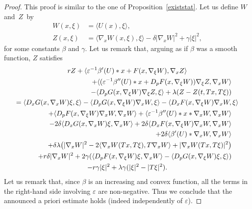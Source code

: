 \documentclass[JEP,XML,SOM,Unicode,NoEqCountersInSection,published]{cedram}
\let\epsilon\varepsilon
\theoremstyle{definition}
\begin{document}
\begin{proof}
This proof is similar to the one of Proposition~\ref{existstat}. Let us define $W$ and~$Z$~by
\begin{align*}
W(x,\xi) &= \langle U(x),\xi\rangle,\\
Z(x,\xi) &= \langle \nabla_x W (x, \xi), \xi\rangle-\delta |\nabla_x W|^2+\gamma |\xi|^2,
\end{align*}
for some constants $\beta$ and $\gamma$. Let us remark that, arguing as if $\beta$ was a smooth function, $Z$ satisfies\vspace*{-5pt}
\begin{multline}\label{Zedppenal}
 r Z+\langle \epsilon^{-1}\beta'(U)*x+F(x,\nabla_{\xi} W), \nabla_x Z\rangle\\
\shoveright{ +\langle (\epsilon^{-1}\beta''(U)*x+D_p F (x,\nabla_{\xi} W)) \nabla_{\xi}Z , \nabla_{x} W\rangle}\\
\shoveright{- \langle D_p G(x, \nabla_{\xi}W)\nabla_{\xi}Z, \xi\rangle+\lambda(Z- Z(t,Tx, T\xi))}\\
 = \langle D_xG(x, \nabla_x W) \xi, \xi\rangle-\langle D_pG(x, \nabla_{\xi}W) \nabla_x W, \xi\rangle-\langle D_x F(x, \nabla_{\xi} W) \nabla_x W, \xi\rangle \\
\shoveright{+ \langle D_p F(x, \nabla_{\xi}W) \nabla_x W, \nabla_x W\rangle+\langle \epsilon^{-1} \beta''(U)*x*\nabla_x W, \nabla_x W\rangle}\\
\shoveright{- 2 \delta \langle D_x G(x, \nabla_x W)\xi, \nabla_x W\rangle
+2 \delta \langle D_x F(x, \nabla_{\xi} W) \nabla_x W, \nabla_x W\rangle}\\
\shoveright{+2 \delta \langle \beta'(U)*\nabla_x W, \nabla_x W\rangle}\\
\shoveright{+\delta \lambda \bigl(|\nabla_x W|^2-2 \langle \nabla_x W(Tx, T \xi), T \nabla_x W\rangle+| \nabla_x W(Tx, T \xi)|^2 \bigr)} \\
\shoveright{+r \delta |\nabla_x W|^2+2 \gamma(\langle D_p F (x,\nabla_{\xi} W) \xi , \nabla_{x} W\rangle-\langle D_p G(x, \nabla_{\xi}W)\xi, \xi\rangle)}\\
 -r\gamma |\xi|^2+\lambda \gamma (|\xi|^2-|T\xi|^2).
\end{multline}
Let us remark that, since $\beta$ is an increasing and convex function, all the terms in the right-hand side involving $\epsilon$ are non-negative. Thus we conclude that the announced a priori estimate holds (indeed independently of $\epsilon$).
\end{proof}
\end{document}
